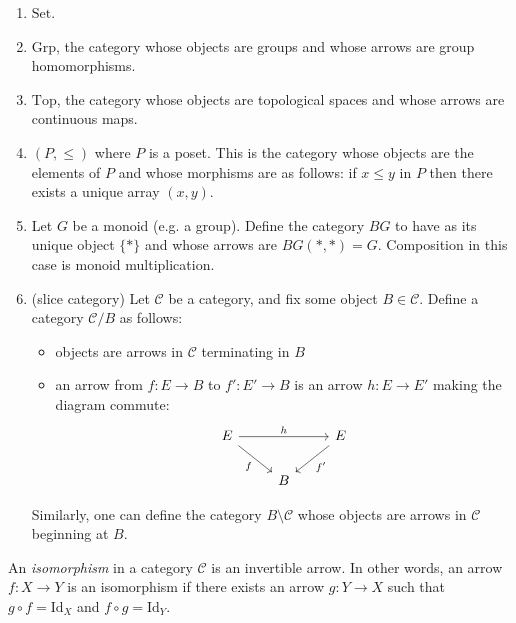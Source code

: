 \documentclass[12pt]{article}
\begin{document}
\begin{example}
	\hfill 
	\begin{enumerate}
		\item $\text{Set}$.
		\item $\text{Grp}$, the category whose objects are groups and whose arrows are group homomorphisms.
		\item $\text{Top}$, the category whose objects are topological spaces and whose arrows are continuous maps.
		\item $(P,\leq)$ where $P$ is a poset. This is the category whose objects are the elements of $P$ and whose morphisms are as follows: if $x\leq y$ in $P$ then there exists a unique array $(x,y)$.
		\item Let $G$ be a monoid (e.g. a group). Define the category $BG$ to have as its unique object $\{\ast\}$ and whose arrows are $BG(\ast,\ast)=G$. Composition in this case is monoid multiplication.
		\item (slice category) Let $\mathcal{C}$ be a category, and fix some object $B\in\mathcal{C}$. Define a category $\mathcal{C}/B$ as follows:
			\begin{itemize}
				\item objects are arrows in $\mathcal{C}$ terminating in $B$
				\item an arrow from $f:E\to B$ to $f':E'\to B$ is an arrow $h:E\to E'$ making the diagram commute:
					\begin{equation*}
\begin{tikzcd}
E \arrow[rr, "h"] \arrow[rd, "f"'] &   & E \arrow[ld, "f'"] \\
                                   & B &                   
\end{tikzcd}
					\end{equation*}
			\end{itemize}
			Similarly, one can define the category $B\setminus \mathcal{C}$ whose objects are arrows in $\mathcal{C}$ beginning at $B$.
	\end{enumerate}
\end{example}

\begin{definition}
	An \emph{isomorphism} in a category $\mathcal{C}$ is an invertible arrow. In other words, an arrow $f:X\to Y$ is an isomorphism if there exists an arrow $g:Y\to X$ such that $g\circ f = \text{Id}_X$ and $f\circ g=\text{Id}_Y$.
\end{definition}
\end{document}
